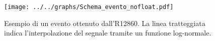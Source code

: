 \begin{figure}[H] \centering \texttt{[image: ../../graphs/Schema\_evento\_nofloat.pdf]}\caption{Esempio di un evento ottenuto dall'R12860. La linea tratteggiata indica l'interpolazione del segnale tramite un funzione log-normale.}\label{gr:Schema_evento} \end{figure}
